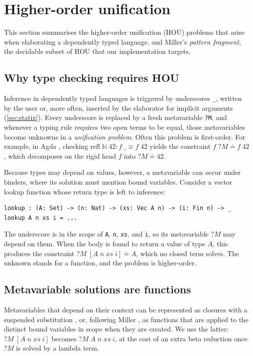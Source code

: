 \section{\label{sec:hou}Higher-order unification}

This section summarises the higher-order unification (HOU) problems that arise
when elaborating a dependently typed language, and Miller's \emph{pattern
fragment}, the decidable subset of HOU that our implementation targets.

\subsection{Why type checking requires HOU}
Inference in dependently typed languages is triggered by underscores
\texttt{\_}, written by the user or, more often, inserted by the elaborator for
implicit arguments (\cref{sec:statix}). Every underscore is replaced by a fresh
metavariable \texttt{?M}, and whenever a typing rule requires two open
terms to be equal, those metavariables become unknowns in a \emph{unification
problem}. Often this problem is first-order. For example, in Agda
\autocite{norell2009dependently}, checking
$\mathrm{refl}\;\mathbb{N}\;42 : f\;\_ \equiv f\;42$ yields the constraint
$f\;?M \doteq f\;42$, which decomposes on the rigid head $f$ into
$?M \doteq 42$.

Because types may depend on values, however, a metavariable can occur under
binders, where its solution must mention bound variables. Consider a vector
lookup function whose return type is left to inference:
\begin{lstlisting}[caption={Higher-order constraint arising from an underscore under a binder}]
lookup : (A: Set) -> (n: Nat) -> (xs: Vec A n) -> (i: Fin n) -> _
lookup A n xs i = ...
\end{lstlisting}
The underscore is in the scope of \texttt{A}, \texttt{n},
\texttt{xs}, and \texttt{i}, so its metavariable $?M$ may depend on them. When
the body is found to return a value of type $A$, this produces the constraint
$?M\;[A\;n\;\mathit{xs}\;i] \doteq A$, which no closed term solves. The unknown
stands for a function, and the problem is higher-order.

\subsection{Metavariable solutions are functions}
Metavariables that depend on their context can be represented as closures with
a suspended substitution \autocite{nanevski2008contextual}, or, following
Miller \autocite{miller_logic_1991}, as functions that are applied to the
distinct bound variables in scope when they are created. We use the latter:
$?M\;[A\;n\;\mathit{xs}\;i]$ becomes $?M\;A\;n\;\mathit{xs}\;i$, at the cost of
an extra beta reduction once $?M$ is solved by a lambda term.

